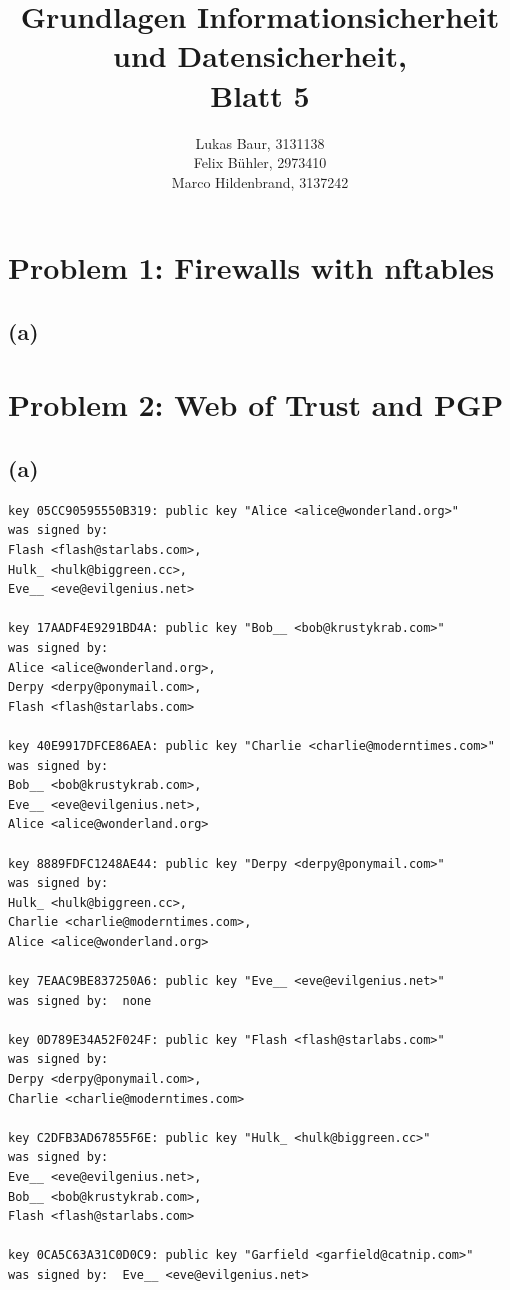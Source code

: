 \documentclass[12pt,pdftex,a4paper]{article}
\begin{document}
\title{ Grundlagen Informationsicherheit und Datensicherheit,\\ Blatt 5}
\author{Lukas Baur, 3131138\\
		Felix Bühler, 2973410\\
		Marco Hildenbrand, 3137242}
\maketitle
\section*{Problem 1: Firewalls with nftables}
\subsection*{(a)}


\newpage
\section*{Problem 2: Web of Trust and PGP}
\subsection*{(a)}

\begin{verbatim}
key 05CC90595550B319: public key "Alice <alice@wonderland.org>"
was signed by:
Flash <flash@starlabs.com>,
Hulk_ <hulk@biggreen.cc>,
Eve__ <eve@evilgenius.net>

key 17AADF4E9291BD4A: public key "Bob__ <bob@krustykrab.com>"
was signed by:
Alice <alice@wonderland.org>,
Derpy <derpy@ponymail.com>,
Flash <flash@starlabs.com>

key 40E9917DFCE86AEA: public key "Charlie <charlie@moderntimes.com>"
was signed by:
Bob__ <bob@krustykrab.com>,
Eve__ <eve@evilgenius.net>,
Alice <alice@wonderland.org>

key 8889FDFC1248AE44: public key "Derpy <derpy@ponymail.com>"
was signed by:
Hulk_ <hulk@biggreen.cc>,
Charlie <charlie@moderntimes.com>,
Alice <alice@wonderland.org>

key 7EAAC9BE837250A6: public key "Eve__ <eve@evilgenius.net>"
was signed by:	none

key 0D789E34A52F024F: public key "Flash <flash@starlabs.com>"
was signed by:
Derpy <derpy@ponymail.com>,
Charlie <charlie@moderntimes.com>

key C2DFB3AD67855F6E: public key "Hulk_ <hulk@biggreen.cc>"
was signed by:
Eve__ <eve@evilgenius.net>,
Bob__ <bob@krustykrab.com>,
Flash <flash@starlabs.com>

key 0CA5C63A31C0D0C9: public key "Garfield <garfield@catnip.com>"
was signed by:	Eve__ <eve@evilgenius.net>
\end{verbatim}
\end{document}
